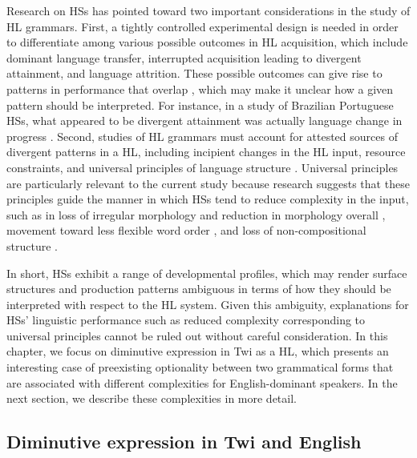 \documentclass[output=paper,colorlinks,citecolor=brown]{langscibook}
\begin{document}
Research on HSs has pointed toward two important considerations in the study of HL grammars. First, a tightly controlled experimental design is needed in order to differentiate among various possible outcomes in HL acquisition, which include dominant language transfer, interrupted acquisition leading to divergent attainment, and language attrition. These possible outcomes can give rise to patterns in performance that overlap \citep{ScontrasFuchsPolinsky2015}, which may make it unclear how a given pattern should be interpreted. For instance, in a study of Brazilian Portuguese HSs, what appeared to be divergent attainment was actually language change in progress \citep{PiresRothman2009}. Second, studies of HL grammars must account for attested sources of divergent patterns in a HL, including incipient changes in the HL input, resource constraints, and universal principles of language structure \citep{ScontrasFuchsPolinsky2015}. Universal principles are particularly relevant to the current study because research suggests that these principles guide the manner in which HSs tend to reduce complexity in the input, such as in loss of irregular morphology and reduction in morphology overall \citep{BenmamounMontrulPolinsky2013Defining, BenmamounPolinsky2013Heritage}, movement toward less flexible word order \citep{IsurinIvanovaSullivan2008, IvanovaSullivan2014}, and loss of non-compositional structure \citep{Dubinina2012, RakhilinaMarushkina2014}.

In short, HSs exhibit a range of developmental profiles, which may render surface structures and production patterns ambiguous in terms of how they should be interpreted with respect to the HL system. Given this ambiguity, explanations for HSs' linguistic performance such as reduced complexity corresponding to universal principles cannot be ruled out without careful consideration. In this chapter, we focus on diminutive expression in Twi as a HL, which presents an interesting case of preexisting optionality between two grammatical forms that are associated with different complexities for English-dominant speakers. In the next section, we describe these complexities in more detail.

\subsection{Diminutive expression in Twi and English}
\label{DimExpSec}
\end{document}
